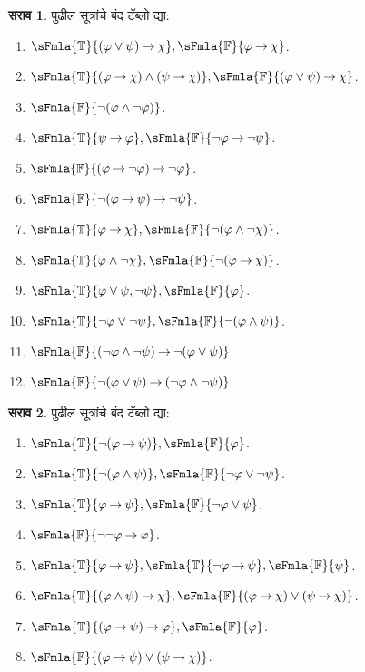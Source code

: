 \documentclass[11pt,a4paper,openany]{book}
\theoremstyle{definition}
\newtheorem{prob}{सराव}[chapter]
\newcommand{\lif}{\mathbin{\to}}
\newcommand{\True}{\ensuremath{\mathbb{T}}}
\newcommand{\False}{\ensuremath{\mathbb{F}}}
\begin{document}
\begin{prob}
पुढील सूत्रांचे बंद टॅब्लो द्या:
\begin{enumerate}
\item $\sFmla{\True}{(\varphi \lor \psi) \lif \chi}, \sFmla{\False}{\varphi \lif \chi}$.
\item $\sFmla{\True}{(\varphi \lif \chi) \land (\psi \lif \chi)}, \sFmla{\False}{(\varphi \lor \psi) \lif \chi}$.
\item $\sFmla{\False}{\lnot(\varphi \land \lnot \varphi)}$.
\item $\sFmla{\True}{\psi \lif \varphi}, \sFmla{\False}{\lnot \varphi \lif \lnot \psi}$.
\item $\sFmla{\False}{(\varphi \lif \lnot \varphi) \lif \lnot \varphi}$.
\item $\sFmla{\False}{\lnot(\varphi \lif \psi) \lif \lnot \psi}$.
\item $\sFmla{\True}{\varphi \lif \chi}, \sFmla{\False}{\lnot (\varphi \land \lnot \chi)}$.
\item $\sFmla{\True}{\varphi \land \lnot \chi}, \sFmla{\False}{\lnot (\varphi \lif \chi)}$.
\item $\sFmla{\True}{\varphi \lor \psi, \lnot \psi}, \sFmla{\False}{\varphi}$.
\item $\sFmla{\True}{\lnot \varphi \lor \lnot \psi}, \sFmla{\False}{\lnot(\varphi \land \psi)}$.
\item $\sFmla{\False}{(\lnot \varphi \land \lnot \psi) \lif\lnot(\varphi \lor \psi)}$.
\item $\sFmla{\False}{\lnot(\varphi \lor \psi) \lif (\lnot \varphi \land \lnot \psi)}$.
\end{enumerate}
\end{prob}

\begin{prob}
पुढील सूत्रांचे बंद टॅब्लो द्या:
\begin{enumerate}
\item $\sFmla{\True}{\lnot(\varphi \lif \psi)}, \sFmla{\False}{\varphi}$.
\item $\sFmla{\True}{\lnot(\varphi \land \psi)}, \sFmla{\False}{\lnot \varphi \lor \lnot \psi}$.
\item $\sFmla{\True}{\varphi \lif \psi}, \sFmla{\False}{\lnot \varphi \lor \psi}$.
\item $\sFmla{\False}{\lnot \lnot \varphi \lif \varphi}$.
\item $\sFmla{\True}{\varphi \lif \psi}, \sFmla{\True}{\lnot \varphi \lif \psi}, \sFmla{\False}{\psi}$.
\item $\sFmla{\True}{(\varphi \land \psi) \lif \chi}, \sFmla{\False}{(\varphi \lif \chi) \lor (\psi \lif \chi)}$.
\item $\sFmla{\True}{(\varphi \lif \psi) \lif \varphi}, \sFmla{\False}{\varphi}$.
\item $\sFmla{\False}{(\varphi \lif \psi) \lor (\psi \lif \chi)}$.
\end{enumerate}
\end{prob}
\end{document}
